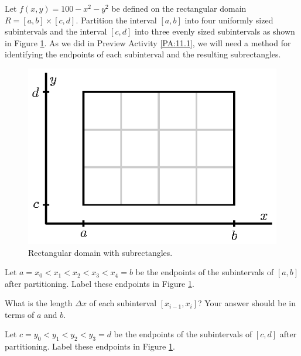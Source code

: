 \begin{activity} \label{A:11.1.1} Let $f(x,y) = 100 - x^2-y^2$ be defined on the rectangular domain $R = [a,b] \times [c,d]$. Partition the interval $[a,b]$ into four uniformly sized subintervals and the interval $[c,d]$ into three evenly sized subintervals as shown in Figure \ref{F:11.1.Domain2}. As we did in Preview Activity \ref{PA:11.1}, we will need a method for identifying the endpoints of each subinterval and the resulting subrectangles.

\begin{figure}[ht]
\begin{center}
  \includegraphics{figures/fig_11_1_rect_general.eps}
\end{center}
\caption{Rectangular domain with subrectangles.}
\label{F:11.1.Domain2}
\end{figure}
 


	\ba
	\item Let $a=x_0 < x_1 < x_2 < x_3 < x_4 =b$ be the endpoints of the subintervals of $[a,b]$ after partitioning. Label these endpoints in Figure \ref{F:11.1.Domain2}.
	
	
	
	\item What is the length $\Delta x$ of each subinterval $[x_{i-1},x_i]$? Your answer should be in terms of $a$ and $b$.
	
	
		
	\item Let $c=y_0 < y_1 < y_2 < y_3 =d$ be the endpoints of the subintervals of $[c,d]$ after partitioning. Label these endpoints in Figure \ref{F:11.1.Domain2}.
	
		
	

\end{activity}
